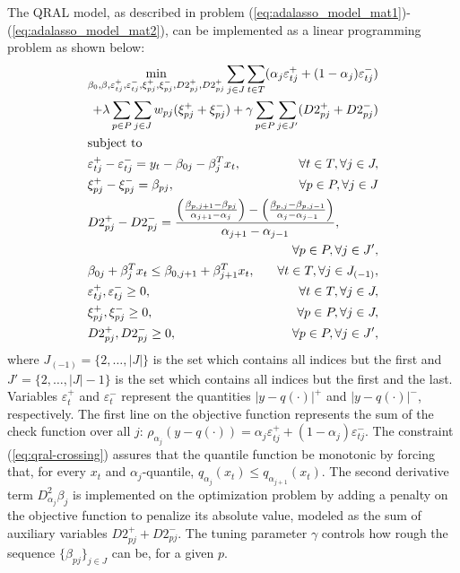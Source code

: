 The QRAL model, as described in problem (\ref{eq:adalasso_model_mat1})-(\ref{eq:adalasso_model_mat2}), can be implemented as a linear programming problem as shown below:
\begin{align}
	& \underset{\beta_{0},\beta,\varepsilon_{t j}^{+},\varepsilon_{t j}^{-},\xi^+_{pj}, \xi^-_{pj}, D2^+_{pj}, D2^+_{pj}}{\text{min}} \sum_{j \in J} \sum_{t \in T}(\alpha_j\varepsilon_{t j}^{+}+(1-\alpha_j)\varepsilon_{t j}^{-}) \span \nonumber  \\
	& \span + \lambda \sum_{p \in P} \sum_{j \in J} w_{pj} (\xi^+_{pj} + \xi^-_{pj}) + \gamma \sum_{p \in P} \sum_{j \in J'} (D2_{pj}^+ + D2_{pj}^-)  \label{eq:adalasso-1} \\
	& \mbox{subject to } \nonumber & \\
	& \varepsilon_{t j}^{+}-\varepsilon_{t j}^{-}=y_{t}-\beta_{0 j}-\beta_{j}^T x_{t},& \forall t \in T ,\forall j \in J,\\
	& \xi_{pj}^+ - \xi_{pj}^- = \beta_{pj},&\forall p \in P, \forall j \in J\\ 
	& D2_{pj}^+ - D2_{pj}^- = \frac{\left(\frac{\beta_{p,j+1}-\beta_{pj}}{\alpha_{j+1}-\alpha_{j}}\right)-\left(\frac{\beta_{p,j}-\beta_{p,j-1}}{\alpha_{j}-\alpha_{j-1}}\right)}{\alpha_{j+1}-\alpha_{j-1}}, \span   \nonumber \\
	& \span \forall p\in P, \forall j \in J',  \\
	& \beta_{0j} + \beta_{j}^T x_{t} \leq \beta_{0,j+1} + \beta_{j+1}^T x_{t},&\forall t \in T, \forall j \in J_{(-1)}, \label{eq:qral-crossing} \\
	& \varepsilon_{t j}^{+},\varepsilon_{t j}^{-}\geq0,&\forall t \in T, \forall j \in J,\\
	& \xi_{pj}^+, \xi_{pj}^- \geq 0, & \forall p\in P, \forall j \in J, \\
	& D2_{pj}^+, D2_{pj}^- \geq 0, & \forall p\in P, \forall j \in J', \label{eq:adalasso-ult} 
\end{align}
where $J_{(-1)} = \{ 2, \dots, |J| \}$ is the set which contains all indices but the first and $J'  = \{ 2, \dots, |J|-1 \}$ is the set which contains all indices but the first and the last.
Variables $\varepsilon^+_t$ and $\varepsilon^-_t$ represent the quantities $|y-q(\cdot)|^+$ and $|y-q(\cdot)|^-$, respectively. The first line on the objective function represents the sum of the check function over all $j$: $ \rho_{\alpha_j}(y-q(\cdot)) = \alpha_j \varepsilon^+_{tj} + (1-\alpha_j) \varepsilon^-_{tj}$. The constraint (\ref{eq:qral-crossing}) assures that the quantile function be monotonic by forcing that, for every $x_t$ and $\alpha_j$-quantile, $q_{\alpha_{j}}(x_t) \leq q_{\alpha_{j+1}}(x_t)$.
The second derivative term $D^2_{\alpha_j}\beta_j$ is implemented on the optimization problem by adding a penalty on the objective function to penalize its absolute value, modeled as the sum of auxiliary variables $D2_{pj}^+ + D2_{pj}^-$. The tuning parameter $\gamma$ controls how rough the sequence $\{\beta_{pj}\}_{j \in J}$ can be, for a given $p$.

